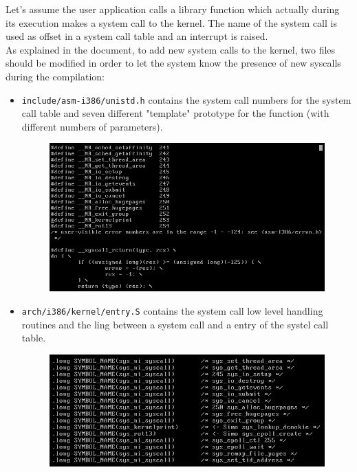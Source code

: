 \documentclass{article}
\begin{document}
Let's assume the user application calls a library function which actually during its execution makes a
system call to the kernel. The name of the system call is used as offset in a system call table and 
an interrupt is raised.\\ 

As explained in the document, to add new system calls to the kernel, two files should be modified
in order to let the system know the presence of new syscalls during the compilation:
\begin{itemize}
    \item \texttt{include/asm-i386/unistd.h} contains the system call numbers for the system call table
      and seven different "template" prototype for the function (with different numbers of parameters).
      \begin{figure}
      \centering
        \includegraphics[width=.8\textwidth]{./unistd.png}
      \end{figure}
    \item \texttt{arch/i386/kernel/entry.S} contains the system call low level handling routines and 
      the ling between a system call and a entry of the systel call table.
      \begin{figure}
      \centering
        \includegraphics[width=.8\textwidth]{./entrys.png}
      \end{figure}
\end{itemize}
\end{document}
